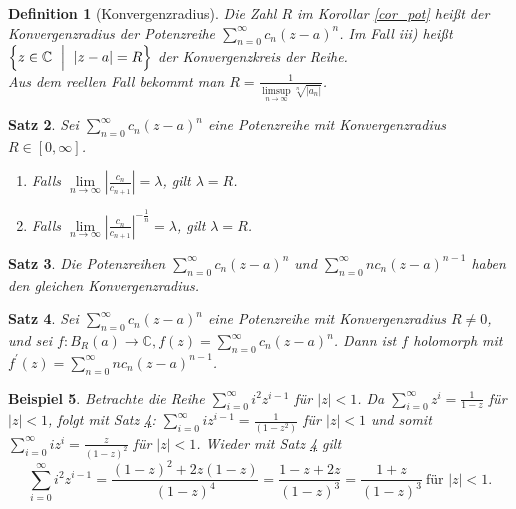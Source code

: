 \documentclass[a4paper,12pt]{article}
\theoremstyle{newthm}
\newtheorem{thm}{Satz}[subsection]
\theoremstyle{newdef}
\newtheorem{defn}[thm]{Definition}
\theoremstyle{newrem}
\newtheorem{exmp}[thm]{Beispiel}
\newcommand{\C}{\mathbb{C}}
\begin{document}
		\begin{defn}[Konvergenzradius]
			Die Zahl $R$ im Korollar \ref{cor_pot} heißt der \emph{Konvergenzradius der Potenzreihe} $ \sum\limits_{n=0}^\infty c_n (z-a)^n $. Im Fall \textit{iii)} heißt $ \Bigl\{ z \in \C\ \Bigm|\ |z-a|=R \Bigr\} $ der \emph{Konvergenzkreis der Reihe}.\\
			Aus dem reellen Fall bekommt man $ R = \frac{1}{\limsup\limits_{n \to \infty}\sqrt[n]{|a_n|}} $.
		\end{defn}
		
		\begin{thm}
			Sei $ \sum\limits_{n=0}^\infty c_n (z-a)^n $ eine Potenzreihe mit Konvergenzradius $ R \in [0,\infty] $.
			\begin{enumerate}[label = {\roman*})]
				\item Falls $ \lim\limits_{n \to \infty} \left|\frac{c_n}{c_{n+1}}\right| = \lambda $, gilt $ \lambda = R $.
				\item Falls $ \lim\limits_{n \to \infty} \left|\frac{c_n}{c_{n+1}}\right|^{-\frac{1}{n}} = \lambda $, gilt $ \lambda = R $.
			\end{enumerate}
		\end{thm}
		
		\begin{thm}
			Die Potenzreihen $ \sum\limits_{n=0}^\infty c_n (z-a)^n $ und $ \sum\limits_{n=0}^\infty n c_n (z-a)^{n-1} $ haben den gleichen Konvergenzradius.
		\end{thm}
		
		\begin{thm}\label{thm_series}
			Sei $ \sum\limits_{n=0}^\infty c_n (z-a)^n $ eine Potenzreihe mit Konvergenzradius $R \neq 0$, und sei $ f: B_R(a) \to \C, f(z) = \sum\limits_{n=0}^\infty c_n (z-a)^n $. Dann ist $f$ holomorph mit $ f^\prime(z) = \sum\limits_{n=0}^\infty n c_n (z-a)^{n-1} $.
		\end{thm}
		
		\begin{exmp}
			Betrachte die Reihe $ \sum\limits_{i=0}^\infty i^2 z^{i-1} $ für $|z| < 1$. Da $ \sum\limits_{i=0}^\infty z^{i} = \frac{1}{1-z} $ für $|z|<1$, folgt mit Satz \ref{thm_series}: $ \sum\limits_{i=0}^\infty i z^{i-1} = \frac{1}{(1-z^2)} $ für $|z|<1$ und somit $ \sum\limits_{i=0}^\infty i z^{i} = \frac{z}{(1-z)^2} $ für $|z|<1$. Wieder mit Satz \ref{thm_series} gilt
			\[ \sum\limits_{i=0}^\infty i^2 z^{i-1} = \frac{(1-z)^2+2z(1-z)}{(1-z)^4} = \frac{1-z+2z}{(1-z)^3} = \frac{1+z}{(1-z)^3}\ \text{für } |z|<1. \]
		\end{exmp}
		
\end{document}
